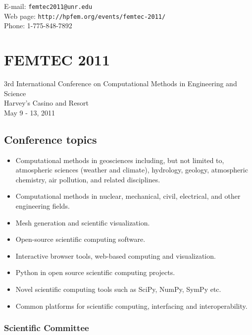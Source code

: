 \documentclass[article,A4,11pt]{llncs}
\begin{document}
\noindent
E-mail: {\tt femtec2011@unr.edu}\\
Web page: {\tt http://hpfem.org/events/femtec-2011/}\\
Phone: 1-775-848-7892

\chapter*{\huge FEMTEC 2011}
\vspace{-5mm}
\normalsize   
\begin{center}
3rd International Conference on Computational Methods in Engineering and Science\\
Harvey's Casino and Resort\\ 
May 9 - 13, 2011\\
\end{center}
\vspace{-3mm}

\section*{Conference topics}

\begin{itemize}
\item Computational methods in geosciences including, but not limited to, 
      atmospheric sciences (weather and climate), hydrology, geology, 
      atmospheric chemistry, air pollution, and related disciplines. 
\item Computational methods in nuclear, mechanical, civil, electrical, and 
      other engineering fields. 
\item Mesh generation and scientific visualization. 
\item Open-source scientific computing software.
\item Interactive browser tools, web-based computing and visualization.
\item Python in open source scientific computing projects.
\item Novel scientific computing tools such as SciPy, NumPy, SymPy etc.
\item Common platforms for scientific computing, interfacing and interoperability.
\end{itemize}

\subsection*{Scientific Committee}
\end{document}
